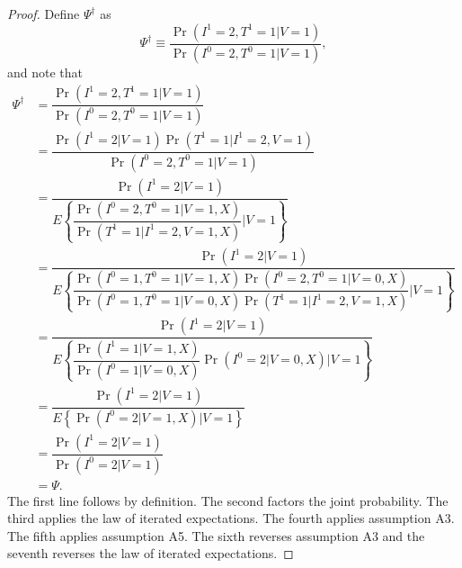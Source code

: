 \documentclass{article}
\begin{document}
\begin{proof}
    Define $\Psi^\dagger$ as 
    \begin{equation*}
        \Psi^\dagger \equiv  \dfrac{\Pr(I^1=2, T^1 = 1|V=1)}{\Pr(I^0=2, T^0 = 1|V=1)},
    \end{equation*}
    and note that
    \begin{align*}
        \Psi^\dagger &= \dfrac{\Pr(I^1=2, T^1 = 1|V=1)}{\Pr(I^0=2, T^0 = 1|V=1)} \\
        &= \dfrac{\Pr(I^1 = 2 | V = 1)\Pr(T^1 = 1 | I^1 = 2, V = 1)}{\Pr(I^0=2, T^0 = 1|V=1)} \\
        & = \dfrac{\Pr(I^1 = 2 | V = 1)}{E\left\{\dfrac{\Pr(I^0 = 2, T^0 = 1 | V = 1, X)}{\Pr(T^1 = 1 | I^1 = 2, V = 1, X)}  \bigg| V = 1\right\}} \\
        & = \dfrac{\Pr(I^1 = 2 | V = 1)}{E\left\{\dfrac{\Pr(I^0 = 1, T^0 = 1 | V = 1, X)\Pr(I^0 = 2, T^0 = 1 | V = 0, X)}{\Pr(I^0 = 1, T^0 = 1 | V = 0, X)\Pr(T^1 = 1 | I^1 = 2, V = 1, X)}  \bigg| V = 1\right\}} \\
        & = \dfrac{\Pr(I^1 = 2 | V = 1)}{E\left\{\dfrac{\Pr(I^1 = 1 | V = 1, X)}{\Pr(I^0 = 1 | V = 0, X)}\Pr(I^0 = 2 | V = 0, X)  \bigg| V = 1\right\}} \\
        & = \dfrac{\Pr(I^1 = 2 | V = 1)}{E\left\{\Pr(I^0 = 2 | V = 1, X)  \bigg| V = 1\right\}} \\
        & = \dfrac{\Pr(I^1 = 2 | V = 1)}{\Pr(I^0 = 2 | V = 1)} \\
        &= \Psi.
    \end{align*}
    The first line follows by definition. The second factors the joint probability. The third applies the law of iterated expectations. The fourth applies assumption A3. The fifth applies assumption A5. The sixth reverses assumption A3 and the seventh reverses the law of iterated expectations. 


\end{proof}
\end{document}
